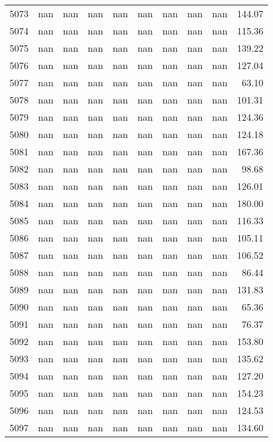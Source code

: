 \begin{tabular}{lrrrrrrrrr}
5073 & nan & nan & nan & nan & nan & nan & nan & nan & 144.07 \\
5074 & nan & nan & nan & nan & nan & nan & nan & nan & 115.36 \\
5075 & nan & nan & nan & nan & nan & nan & nan & nan & 139.22 \\
5076 & nan & nan & nan & nan & nan & nan & nan & nan & 127.04 \\
5077 & nan & nan & nan & nan & nan & nan & nan & nan & 63.10 \\
5078 & nan & nan & nan & nan & nan & nan & nan & nan & 101.31 \\
5079 & nan & nan & nan & nan & nan & nan & nan & nan & 124.36 \\
5080 & nan & nan & nan & nan & nan & nan & nan & nan & 124.18 \\
5081 & nan & nan & nan & nan & nan & nan & nan & nan & 167.36 \\
5082 & nan & nan & nan & nan & nan & nan & nan & nan & 98.68 \\
5083 & nan & nan & nan & nan & nan & nan & nan & nan & 126.01 \\
5084 & nan & nan & nan & nan & nan & nan & nan & nan & 180.00 \\
5085 & nan & nan & nan & nan & nan & nan & nan & nan & 116.33 \\
5086 & nan & nan & nan & nan & nan & nan & nan & nan & 105.11 \\
5087 & nan & nan & nan & nan & nan & nan & nan & nan & 106.52 \\
5088 & nan & nan & nan & nan & nan & nan & nan & nan & 86.44 \\
5089 & nan & nan & nan & nan & nan & nan & nan & nan & 131.83 \\
5090 & nan & nan & nan & nan & nan & nan & nan & nan & 65.36 \\
5091 & nan & nan & nan & nan & nan & nan & nan & nan & 76.37 \\
5092 & nan & nan & nan & nan & nan & nan & nan & nan & 153.80 \\
5093 & nan & nan & nan & nan & nan & nan & nan & nan & 135.62 \\
5094 & nan & nan & nan & nan & nan & nan & nan & nan & 127.20 \\
5095 & nan & nan & nan & nan & nan & nan & nan & nan & 154.23 \\
5096 & nan & nan & nan & nan & nan & nan & nan & nan & 124.53 \\
5097 & nan & nan & nan & nan & nan & nan & nan & nan & 134.60 \\

\end{tabular}

